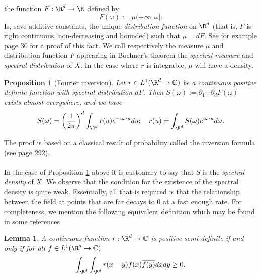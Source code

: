 \documentclass[12pt]{article}
\newtheorem{proposition}{Proposition}
\newtheorem{lemma}{Lemma}
\begin{document}
the function $F:\R^d\to \R$ defined by
\begin{equation*}
    F(\omega):= \mu (-\infty,\omega].
\end{equation*}
Is, save additive constants, the unique \emph{distribution function} on $\R^d$ (that is,  $F$ is right continuous, non-decreasing and bounded) such that $\mu =dF$. See for example \cite{ash2000probability} page $30$ for a proof of this fact. We call respectively the measure $\mu$ and distribution function $F$ appearing in Bochner's theorem  the \emph{spectral measure} and \emph{spectral distribution} of $X$. In the case where $r$ is integrable, $\mu$ will have a density.
\begin{proposition}[{Fourier inversion}]\label{Fourier inversion}
    Let $r\in L^1(\R^d\to\C)$ be a continuous positive definite function with spectral distribution $dF$. Then
    $S(\omega):=\partial_1\cdots\partial_d F(\omega)$ exists almost everywhere, and we have
    \begin{equation*}
        S(\omega)=\qty(\frac{1}{2\pi})^d\int_{\R^d} {r}(u)e^{-i\omega\cdot u} d u;\quad    r(u)=\int_{\R^d}S(\omega)e^{i \omega\cdot u} d\omega.
    \end{equation*}
\end{proposition}
The proof is based on a classical result of probability called the inversion formula (see \cite{ash2000probability} page 292).\\
\\
In the case of Proposition \ref{Fourier inversion} above it is customary to say that $S$ is the \emph{spectral density} of $X$. We observe that the condition for the existence of the spectral density is quite weak. Essentially, all that is required is that the relationship between the field at points that are far decays to $0$ at a fast enough rate. For completeness, we mention the following equivalent definition which may be found in some references
\begin{lemma}
    A continuous function $r:\R^d\to\C$ is positive semi-definite if and only if for all $f\in L^1(\R^d\to\C)$
    \begin{equation*}
        \int_{\R^d}\int_{\R^d} r(x-y)f(x)\overline{f(y)}dx dy \geq 0.
    \end{equation*}
\end{lemma}
\end{document}
